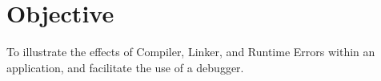 \section{Objective}

To illustrate the effects of Compiler, Linker, and Runtime Errors within an application, and facilitate the use of a debugger.